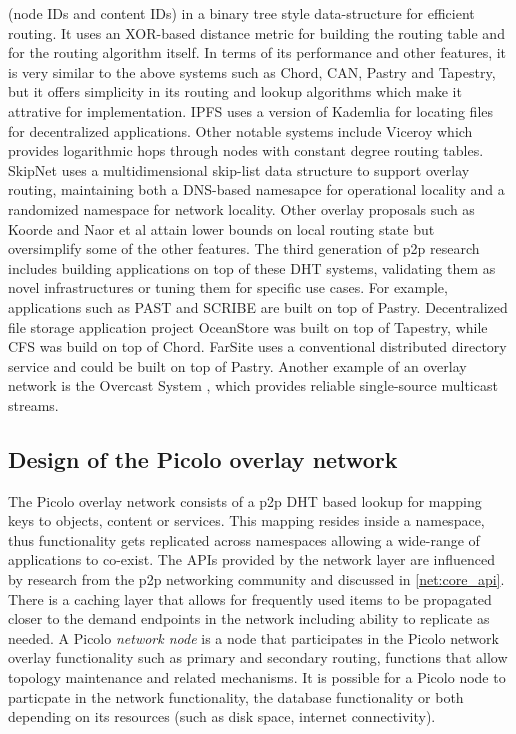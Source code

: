 (node IDs and content IDs) in a binary tree style data-structure for efficient routing. It uses an XOR-based distance
metric for building the routing table and for the routing algorithm itself. In terms of its performance and other
features, it is very similar to the above systems such as Chord, CAN, Pastry and Tapestry, but it offers simplicity in
its routing and lookup algorithms which make it attrative for implementation. IPFS \cite{ipfs} uses a version of
Kademlia for locating files for decentralized applications.
\newline\newline
Other notable systems include Viceroy \cite{viceroy} which provides logarithmic hops through nodes with constant degree
routing tables. SkipNet \cite{skipnet} uses a multidimensional skip-list data structure to support overlay routing,
maintaining both a DNS-based namesapce for operational locality and a randomized namespace for network locality. Other
overlay proposals such as Koorde \cite{koorde} and Naor et al \cite{simple_hash} attain lower bounds on local routing
state but oversimplify some of the other features. 
\newline\newline
The third generation of p2p research includes building applications on top of these DHT systems, validating them as
novel infrastructures or tuning them for specific use cases. For example, applications such as PAST \cite{past} and
SCRIBE \cite{scribe} are built on top of Pastry. Decentralized file storage application project OceanStore \cite{oceanstore} was built
on top of Tapestry, while CFS \cite{cfs} was build on top of Chord. FarSite \cite{farsite} uses a conventional
distributed directory service and could be built on top of Pastry. Another example of an overlay network is the Overcast
System \cite{overcast}, which provides reliable single-source multicast streams.

\subsection{Design of the Picolo overlay network}
\label{net:design}

The \textsf{Picolo} overlay network consists of a p2p DHT based lookup for mapping keys to objects, content or services. This
mapping resides inside a namespace, thus functionality gets replicated across namespaces allowing a wide-range of
applications to co-exist. The APIs provided by the network layer are influenced by research from the p2p networking
community and discussed in \cref{net:core_api}.  There is a caching layer that allows for frequently used items to
be propagated closer to the demand endpoints in the network including ability to replicate as needed. A \textsf{Picolo} {\em network node} is a node that participates in the \textsf{Picolo} network overlay functionality such as primary and
secondary routing, functions that allow topology maintenance and related mechanisms. It is possible for a \textsf{Picolo} node to
particpate in the network functionality, the database functionality or both depending on its resources (such as disk
space, internet connectivity).

